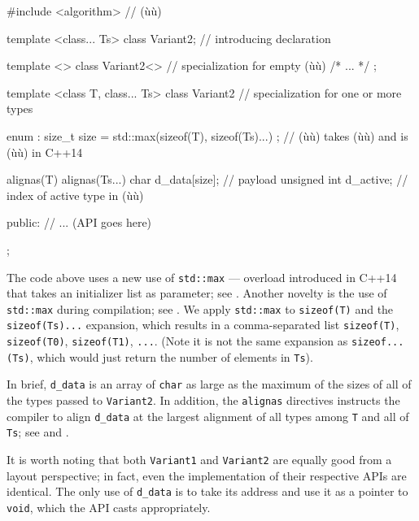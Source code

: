 \begin{emcppslisting}
#include <algorithm>                    // (ù{}ù)

template <class... Ts> class Variant2;  // introducing declaration

template <> class Variant2<>     // specialization for empty (ù{}ù)
{ /* ... */ };

template <class T, class... Ts>
class Variant2                   // specialization for one or more types
{
    enum : size_t { size = std::max({sizeof(T), sizeof(Ts)...}) };
        // (ù{}ù) takes (ù{}ù) and is (ù{}ù) in C++14

    alignas(T) alignas(Ts...)
    char d_data[size];           // payload
    unsigned int d_active;       // index of active type in (ù{}ù)

public:
    // ... (API goes here)
};
\end{emcppslisting}
    

\noindent The code above uses a new use of \lstinline!std::max! --- overload
introduced in C++14 that takes an initializer list as parameter; see
.
Another novelty is the use of \lstinline!std::max! during compilation; see
. We apply
\lstinline!std::max! to \lstinline!sizeof(T)! and the \lstinline!sizeof(Ts)...!
expansion, which results in a comma-separated list \lstinline!sizeof(T)!,
\lstinline!sizeof(T0)!, \lstinline!sizeof(T1)!, \lstinline!...!. (Note it is not
the same expansion as \lstinline!sizeof...(Ts)!, which would just return
the number of elements in \lstinline!Ts!).

In brief, \lstinline!d_data! is an array of \lstinline!char! as large as the
maximum of the sizes of all of the types passed to \lstinline!Variant2!. In
addition, the \lstinline!alignas! directives instructs the compiler to
align \lstinline!d_data! at the largest alignment of all types among
\lstinline!T! and all of \lstinline!Ts!; see  and .

It is worth noting that both \lstinline!Variant1! and \lstinline!Variant2! are
equally good from a layout perspective; in fact, even the implementation
of their respective APIs are identical. The only use of \lstinline!d_data!
is to take its address and use it as a pointer to \lstinline!void!, which
the API casts appropriately.

